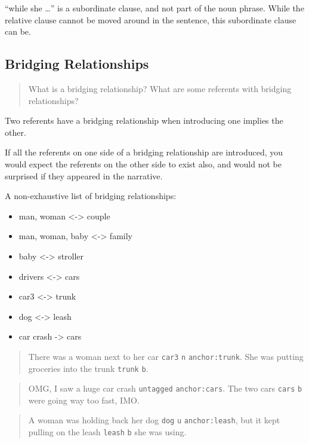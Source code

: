 \documentclass[
]{book}
\providecommand{\tightlist}{%
  \setlength{\itemsep}{0pt}\setlength{\parskip}{0pt}}
\begin{document}
``while she \ldots{}'' is a subordinate clause, and not part of the noun phrase.
While the relative clause cannot be moved around in the sentence,
this subordinate clause can be.

\hypertarget{bridging-relationships}{%
\subsection{Bridging Relationships}\label{bridging-relationships}}

\begin{quote}
What is a bridging relationship?
What are some referents with bridging relationships?
\end{quote}

Two referents have a bridging relationship
when introducing one implies the other.

If all the referents on one side of a bridging relationship are introduced,
you would expect the referents on the other side to exist also,
and would not be surprised if they appeared in the narrative.

A non-exhaustive list of bridging relationships:

\begin{itemize}
\tightlist
\item
  man, woman \textless-\textgreater{} couple
\item
  man, woman, baby \textless-\textgreater{} family
\item
  baby \textless-\textgreater{} stroller
\item
  drivers \textless-\textgreater{} cars
\item
  car3 \textless-\textgreater{} trunk
\item
  dog \textless-\textgreater{} leash
\item
  car crash -\textgreater{} cars
\end{itemize}

\begin{quote}
There was a woman next to her car \texttt{car3} \texttt{n} \texttt{anchor:trunk}.
She was putting groceries into the trunk \texttt{trunk} \texttt{b}.
\end{quote}

\begin{quote}
OMG, I saw a huge car crash \texttt{untagged} \texttt{anchor:cars}.
The two cars \texttt{cars} \texttt{b} were going way too fast, IMO.
\end{quote}

\begin{quote}
A woman was holding back her dog \texttt{dog} \texttt{u} \texttt{anchor:leash},
but it kept pulling on the leash \texttt{leash} \texttt{b} she was using.
\end{quote}
\end{document}

